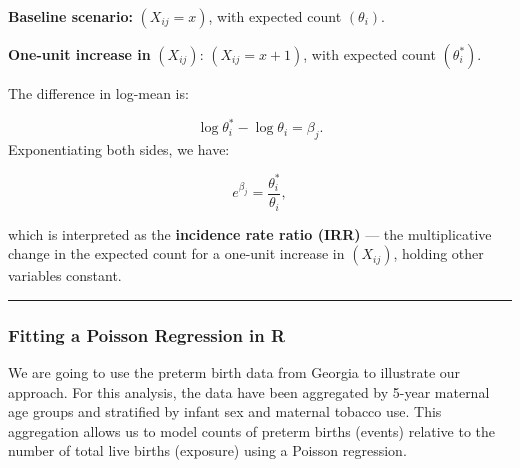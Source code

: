 \documentclass[
  letterpaper,
  DIV=11,
  numbers=noendperiod]{scrreprt}
\begin{document}
\textbf{Baseline scenario:} \((X_{ij} = x)\), with expected count
\((\theta_i )\).

\textbf{One-unit increase in} \((X_{ij})\): \((X_{ij} = x + 1)\), with
expected count \((\theta_i^{*} )\).

The difference in log-mean is:

\[
\log \theta_i^{*} - \log \theta_i = \beta_j.
\] Exponentiating both sides, we have:

\[
e^{\beta_j} = \frac{\theta_i^{*}}{\theta_i},
\]

which is interpreted as the \textbf{incidence rate ratio (IRR)} --- the
multiplicative change in the expected count for a one-unit increase in
\(( X_{ij} )\), holding other variables constant.

\begin{center}\rule{0.5\linewidth}{0.5pt}\end{center}

\hypertarget{fitting-a-poisson-regression-in-r}{%
\subsubsection*{Fitting a Poisson Regression in
R}\label{fitting-a-poisson-regression-in-r}}

We are going to use the preterm birth data from Georgia to illustrate
our approach. For this analysis, the data have been aggregated by 5-year
maternal age groups and stratified by infant sex and maternal tobacco
use. This aggregation allows us to model counts of preterm births
(events) relative to the number of total live births (exposure) using a
Poisson regression.
\end{document}
